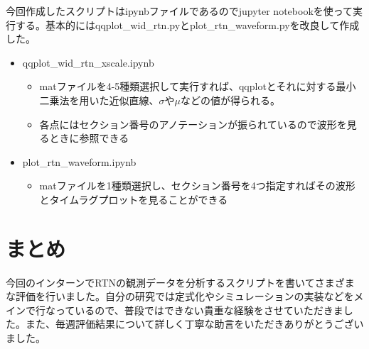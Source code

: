 \documentclass{jsarticle}
\begin{document}
今回作成したスクリプトはipynbファイルであるのでjupyter notebookを使って実行する。基本的にはqqplot\_wid\_rtn.pyとplot\_rtn\_waveform.pyを改良して作成した。

\begin{itemize}
	\item
	qqplot\_wid\_rtn\_xscale.ipynb
	\begin{itemize}
		\item
		matファイルを4-5種類選択して実行すれば、qqplotとそれに対する最小二乗法を用いた近似直線、$\sigma$や$\mu$などの値が得られる。
		\item
		各点にはセクション番号のアノテーションが振られているので波形を見るときに参照できる
	\end{itemize}
	\item
	plot\_rtn\_waveform.ipynb
	\begin{itemize}
		\item
		matファイルを1種類選択し、セクション番号を4つ指定すればその波形とタイムラグプロットを見ることができる
	\end{itemize}


\end{itemize}

\section{まとめ}

今回のインターンでRTNの観測データを分析するスクリプトを書いてさまざまな評価を行いました。自分の研究では定式化やシミュレーションの実装などをメインで行なっているので、普段ではできない貴重な経験をさせていただきました。また、毎週評価結果について詳しく丁寧な助言をいただきありがとうございました。
\end{document}
